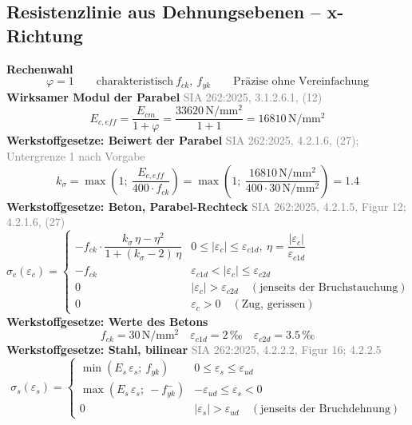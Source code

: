 \documentclass[11pt,a4paper]{article}
\newcommand{\normref}[1]{{\small\textcolor{gray}{#1}}}
\begin{document}
\subsection{Resistenzlinie aus Dehnungsebenen – x-Richtung}
\noindent\textbf{Rechenwahl}
\begin{equation*}
\varphi = 1 \qquad \text{charakteristisch}\ f_{ck},\ f_{yk} \qquad \text{Präzise ohne Vereinfachung}
\end{equation*}
\noindent\textbf{Wirksamer Modul der Parabel} \hfill \normref{SIA 262:2025, 3.1.2.6.1, (12)}
\begin{equation*}
E_{c,eff} = \frac{E_{cm}}{1 + \varphi} = \frac{33620\,\mathrm{N}/\mathrm{mm}^{2}}{1 + 1} = 16810\,\mathrm{N}/\mathrm{mm}^{2}
\end{equation*}
\noindent\textbf{Werkstoffgesetze: Beiwert der Parabel} \hfill \normref{SIA 262:2025, 4.2.1.6, (27); Untergrenze 1 nach Vorgabe}
\begin{equation*}
k_{\sigma} = \max\left(1;\ \frac{E_{c,eff}}{400 \cdot f_{ck}}\right) = \max\left(1;\ \frac{16810\,\mathrm{N}/\mathrm{mm}^{2}}{400 \cdot 30\,\mathrm{N}/\mathrm{mm}^{2}}\right) = 1.4
\end{equation*}
\noindent\textbf{Werkstoffgesetze: Beton, Parabel-Rechteck} \hfill \normref{SIA 262:2025, 4.2.1.5, Figur 12; 4.2.1.6, (27)}
\begin{equation*}
\sigma_c(\varepsilon_c) = \begin{cases} -f_{ck} \cdot \dfrac{k_\sigma\,\eta - \eta^2}{1 + (k_\sigma - 2)\,\eta} & 0 \le |\varepsilon_c| \le \varepsilon_{c1d},\ \eta = \dfrac{|\varepsilon_c|}{\varepsilon_{c1d}} \\[2ex] -f_{ck} & \varepsilon_{c1d} < |\varepsilon_c| \le \varepsilon_{c2d} \\[1ex] 0 & |\varepsilon_c| > \varepsilon_{c2d} \quad (\text{jenseits der Bruchstauchung}) \\[1ex] 0 & \varepsilon_c > 0 \quad (\text{Zug, gerissen}) \end{cases}
\end{equation*}
\noindent\textbf{Werkstoffgesetze: Werte des Betons}
\begin{equation*}
f_{ck} = 30\,\mathrm{N}/\mathrm{mm}^{2} \quad \varepsilon_{c1d} = 2\,\text{‰} \quad \varepsilon_{c2d} = 3.5\,\text{‰}
\end{equation*}
\noindent\textbf{Werkstoffgesetze: Stahl, bilinear} \hfill \normref{SIA 262:2025, 4.2.2.2, Figur 16; 4.2.2.5}
\begin{equation*}
\sigma_s(\varepsilon_s) = \begin{cases} \min(E_s\,\varepsilon_s;\ f_{yk}) & 0 \le \varepsilon_s \le \varepsilon_{ud} \\[1ex] \max(E_s\,\varepsilon_s;\ -f_{yk}^{-}) & -\varepsilon_{ud} \le \varepsilon_s < 0 \\[1ex] 0 & |\varepsilon_s| > \varepsilon_{ud} \quad (\text{jenseits der Bruchdehnung}) \end{cases}
\end{equation*}
\end{document}
